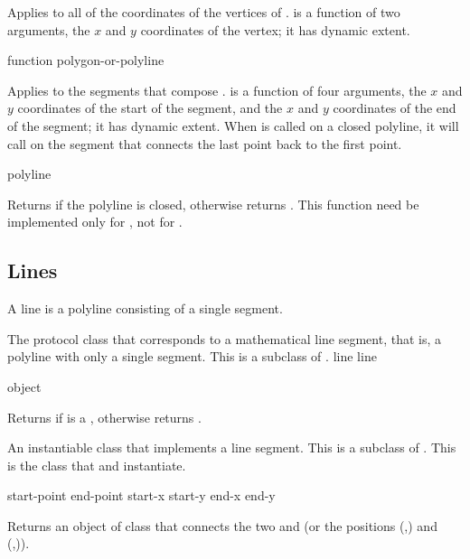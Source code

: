 Applies  to all of the coordinates of the vertices of
.   is a function of two arguments, the
$x$ and $y$ coordinates of the vertex; it has dynamic extent.

 {function polygon-or-polyline}

Applies  to the segments that compose .
 is a function of four arguments, the $x$ and $y$ coordinates of
the start of the segment, and the $x$ and $y$ coordinates of the end of the
segment; it has dynamic extent.  When  is called
on a closed polyline, it will call  on the segment that connects
the last point back to the first point.

 {polyline}

Returns  if the polyline  is closed, otherwise returns
.  This function need be implemented only for , not
for .


\subsection {Lines}

A line is a polyline consisting of a single segment.


The protocol class that corresponds to a mathematical line segment, that is, a
polyline with only a single segment.  This is a subclass of .
 {line} {line}

 {object}

Returns  if  is a , otherwise returns
.


An instantiable class that implements a line segment.  This is a subclass of
.  This is the class that  and 
instantiate.
\Immutable

  {start-point end-point}
 {start-x start-y end-x end-y}

Returns an object of class  that connects the two
  and  (or the positions
(,) and (,)).

\MayCaptureInputs


